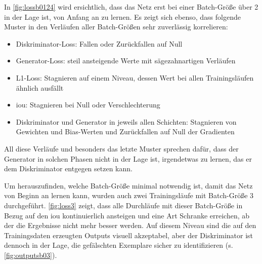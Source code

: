 In \autoref{fig:lossb0124} wird ersichtlich, dass das Netz erst bei einer Batch-Größe über 2 in der Lage ist, von Anfang an zu lernen.
Es zeigt sich ebenso, dass folgende Muster in den Verläufen aller Batch-Größen sehr zuverlässig korrelieren:

\begin{itemize}
	\item Diskriminator-Loss: Fallen oder Zurückfallen auf Null 
	\item Generator-Loss: steil ansteigende Werte mit sägezahnartigen Verläufen
	\item L1-Loss: Stagnieren auf einem Niveau, dessen Wert bei allen Trainingsläufen ähnlich ausfällt
	\item \gls{iou}: Stagnieren bei Null oder Verschlechterung
	\item Diskriminator und Generator in jeweils allen Schichten: Stagnieren von Gewichten und Bias-Werten und Zurückfallen auf Null der Gradienten
\end{itemize}

All diese Verläufe und besonders das letzte Muster sprechen dafür, dass der Generator in solchen Phasen nicht in der Lage ist, irgendetwas zu lernen, das er dem Diskriminator entgegen setzen kann.


Um herauszufinden, welche Batch-Größe minimal notwendig ist, damit das Netz von Beginn an lernen kann, wurden auch zwei Trainingsläufe mit Batch-Größe 3 durchgeführt.
\autoref{fig:loss3} zeigt, dass alle Durchläufe mit dieser Batch-Größe in Bezug auf den \gls{iou} kontinuierlich ansteigen und eine Art Schranke erreichen, ab der die Ergebnisse nicht mehr besser werden.
Auf diesem Niveau sind die auf den Trainingsdaten erzeugten Outputs visuell akzeptabel, aber der Diskriminator ist dennoch in der Lage, die gefälschten Exemplare sicher zu identifizieren (s. \autoref{fig:outputsb03}).


